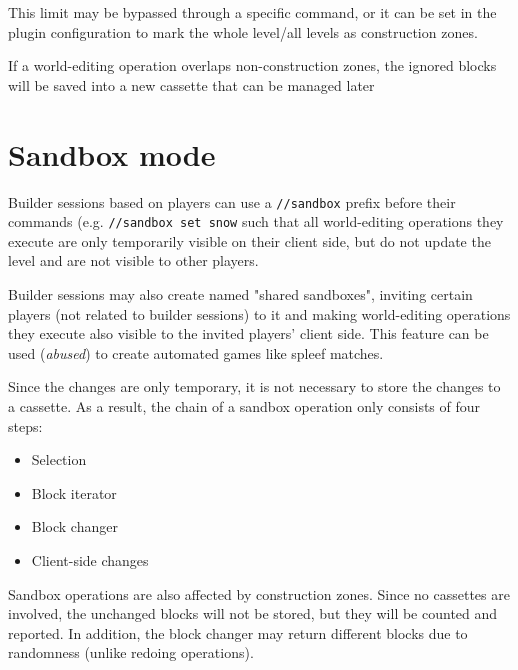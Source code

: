 \documentclass{report}
\begin{document}
			This limit may be bypassed through a specific command, or it can be set in the plugin configuration to mark
			the whole level/all levels as construction zones.

			If a world-editing operation overlaps non-construction zones, the ignored blocks will be saved into a new
			cassette that can be managed later

		\chapter{Sandbox mode}
			Builder sessions based on players can use a \texttt{//sandbox} prefix before their commands (e.g.
			\texttt{//sandbox set snow} such that all world-editing operations they execute are only temporarily visible
			on their client side, but do not update the level and are not visible to other players.

			Builder sessions may also create named "shared sandboxes", inviting certain players (not related to builder
			sessions) to it and making world-editing operations they execute also visible to the invited players' client
			side. This feature can be used (\emph{abused}) to create automated games like spleef matches.

			Since the changes are only temporary, it is not necessary to store the changes to a cassette. As a result,
			the chain of a sandbox operation only consists of four steps:

			\begin{itemize}
				\item Selection
				\item Block iterator
				\item Block changer
				\item Client-side changes
			\end{itemize}

			Sandbox operations are also affected by construction zones. Since no cassettes are involved, the unchanged
			blocks will not be stored, but they will be counted and reported. In addition, the block changer may return
			different blocks due to randomness (unlike redoing operations).

	
\end{document}
